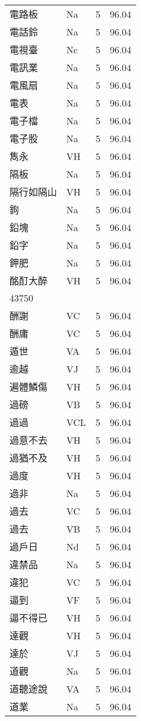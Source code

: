 \documentclass[twocolumn]{book}
\begin{document}
\begin{supertabular}{llrr}
電路板 & Na & 5 &  96.04\\
電話鈴 & Na & 5 &  96.04\\
電視臺 & Nc & 5 &  96.04\\
電訊業 & Na & 5 &  96.04\\
電風扇 & Na & 5 &  96.04\\
電表 & Na & 5 &  96.04\\
電子檔 & Na & 5 &  96.04\\
電子股 & Na & 5 &  96.04\\
雋永 & VH & 5 &  96.04\\
隔板 & Na & 5 &  96.04\\
隔行如隔山 & VH & 5 &  96.04\\
鉤 & Na & 5 &  96.04\\
鉛塊 & Na & 5 &  96.04\\
鉛字 & Na & 5 &  96.04\\
鉀肥 & Na & 5 &  96.04\\
酩酊大醉 & VH & 5 &  96.04\\
43750\\
酬謝 & VC & 5 &  96.04\\
酬庸 & VC & 5 &  96.04\\
遁世 & VA & 5 &  96.04\\
逾越 & VJ & 5 &  96.04\\
遍體鱗傷 & VH & 5 &  96.04\\
過磅 & VB & 5 &  96.04\\
過過 & VCL & 5 &  96.04\\
過意不去 & VH & 5 &  96.04\\
過猶不及 & VH & 5 &  96.04\\
過度 & VH & 5 &  96.04\\
過非 & Na & 5 &  96.04\\
過去 & VC & 5 &  96.04\\
過去 & VB & 5 &  96.04\\
過戶日 & Nd & 5 &  96.04\\
違禁品 & Na & 5 &  96.04\\
違犯 & VC & 5 &  96.04\\
逼到 & VF & 5 &  96.04\\
逼不得已 & VH & 5 &  96.04\\
達觀 & VH & 5 &  96.04\\
達於 & VJ & 5 &  96.04\\
道觀 & Na & 5 &  96.04\\
道聽途說 & VA & 5 &  96.04\\
道業 & Na & 5 &  96.04\\

\end{supertabular}
\end{document}
